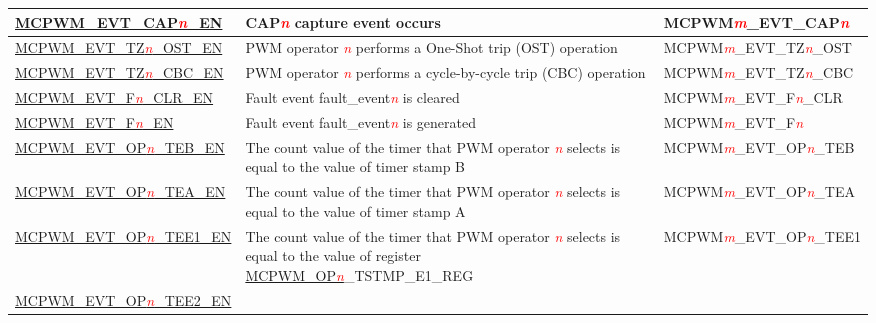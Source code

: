 \begin{ThreePartTable}
\begin{longtable}[c]{| l | L{7cm} | l |}
    \hyperref[fielddesc:MCPWMEVTCAP0EN]{MCPWM\_EVT\_CAP\textcolor{red}{\it{n}}\_EN}  
    &  CAP\textcolor{red}{\it{n}} capture event occurs
    &  MCPWM\textcolor{red}{\it{m}}\_EVT\_CAP\textcolor{red}{\it{n}}    \\\hline
    \hyperref[fielddesc:MCPWMEVTTZ0OSTEN]{MCPWM\_EVT\_TZ\textcolor{red}{\it{n}}\_OST\_EN}  
    &  PWM operator \textcolor{red}{\it{n}} performs a One-Shot trip (OST) operation
    &  MCPWM\textcolor{red}{\it{m}}\_EVT\_TZ\textcolor{red}{\it{n}}\_OST    \\\hline
    \hyperref[fielddesc:MCPWMEVTTZ0CBCEN]{MCPWM\_EVT\_TZ\textcolor{red}{\it{n}}\_CBC\_EN}
    & PWM operator \textcolor{red}{\it{n}} performs a cycle-by-cycle trip (CBC) operation
    & MCPWM\textcolor{red}{\it{m}}\_EVT\_TZ\textcolor{red}{\it{n}}\_CBC    \\\hline
    \hyperref[fielddesc:MCPWMEVTF0CLREN]{MCPWM\_EVT\_F\textcolor{red}{\it{n}}\_CLR\_EN}
    & Fault event fault\_event\textcolor{red}{\it{n}} is cleared
    & MCPWM\textcolor{red}{\it{m}}\_EVT\_F\textcolor{red}{\it{n}}\_CLR    \\\hline
    \hyperref[fielddesc:MCPWMEVTF0EN]{MCPWM\_EVT\_F\textcolor{red}{\it{n}}\_EN}
    & Fault event fault\_event\textcolor{red}{\it{n}} is generated
    & MCPWM\textcolor{red}{\it{m}}\_EVT\_F\textcolor{red}{\it{n}}    \\\hline
    \hyperref[fielddesc:MCPWMEVTOP0TEBEN]{MCPWM\_EVT\_OP\textcolor{red}{\it{n}}\_TEB\_EN}
    & The count value of the timer that PWM operator \textcolor{red}{\it{n}} selects is equal to the value of timer stamp B
    & MCPWM\textcolor{red}{\it{m}}\_EVT\_OP\textcolor{red}{\it{n}}\_TEB    \\\hline
    \hyperref[fielddesc:MCPWMEVTOP0TEAEN]{MCPWM\_EVT\_OP\textcolor{red}{\it{n}}\_TEA\_EN}
    & The count value of the timer that PWM operator \textcolor{red}{\it{n}} selects is equal to the value of timer stamp A
    & MCPWM\textcolor{red}{\it{m}}\_EVT\_OP\textcolor{red}{\it{n}}\_TEA    \\\hline
    \hyperref[fielddesc:MCPWMEVTOPNTEE1EN]{MCPWM\_EVT\_OP\textcolor{red}{\it{n}}\_TEE1\_EN}
    & The count value of the timer that PWM operator \textcolor{red}{\it{n}} selects is equal to the value of register \hyperref[regdesc:MCPWMOPNTSTMPE1REG]{MCPWM\_OP\textcolor{red}{\it{n}}}\_TSTMP\_E1\_REG
    & MCPWM\textcolor{red}{\it{m}}\_EVT\_OP\textcolor{red}{\it{n}}\_TEE1    \\\hline
    \hyperref[fielddesc:MCPWMEVTOPNTEE2EN]{MCPWM\_EVT\_OP\textcolor{red}{\it{n}}\_TEE2\_EN}

\end{longtable}
\end{ThreePartTable}
